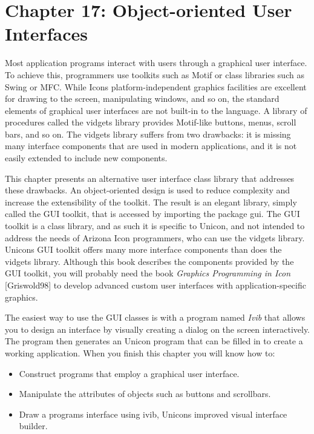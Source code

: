 \clearpage\section{Chapter 17: Object-oriented User Interfaces}

Most application programs interact with users through a graphical
user interface. To achieve this, programmers use
toolkits such as Motif or class libraries such as Swing or MFC. While
Icon{\textquotesingle}s platform-independent graphics facilities are
excellent for drawing to the screen, manipulating
windows, and so on, the standard elements of graphical user interfaces are not built-in to the language. A
library of procedures called the vidgets library provides Motif-like
buttons, menus, scroll bars, and so on. The vidgets library suffers
from two drawbacks: it is missing many interface components that are
used in modern applications, and it is not easily extended to include
new components.

This chapter presents an alternative user interface class library that
addresses these drawbacks. An object-oriented design is used to reduce
complexity and increase the extensibility of the toolkit. The result is
an elegant library, simply called {\textquotedbl}the GUI
toolkit,{\textquotedbl} that is accessed by importing the package gui.
The GUI toolkit is a class library, and as such it is specific to
Unicon, and not intended to address the needs of Arizona Icon
programmers, who can use the vidgets library. Unicon{\textquotesingle}s
GUI toolkit offers many more interface components than does the vidgets
library. Although this book describes the components provided by the
GUI toolkit, you will probably need the book \textit{Graphics
Programming in Icon} [Griswold98] to develop advanced custom user
interfaces with application-specific graphics.

The easiest way to use the GUI classes is with a program named
\textit{Ivib} that allows you to design an interface by visually
creating a dialog on the screen interactively. The program then
generates an Unicon program that can be filled in to create a working
application. When you finish this chapter you will know how to:

\begin{itemize}
\item Construct programs that employ a graphical user interface.
\item Manipulate the attributes of objects such as buttons and
scrollbars.
\item Draw a program{\textquotesingle}s interface using ivib,
Unicon{\textquotesingle}s improved visual interface builder.
\end{itemize}
